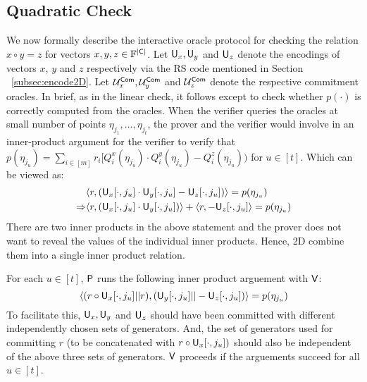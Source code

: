 \subsection{Quadratic Check}\label{subsec:quadcheck2D}
We now formally describe the interactive oracle protocol for checking the relation $x\circ y = z$ for vectors $x,y,z\in \mathbb{F}^{\mathsf{|C|}}$. Let $\mathsf{U}_x, \mathsf{U}_y$ and $\mathsf{U}_z$ denote the encodings of vectors $x$, $y$ and $z$ respectively via the RS code mentioned in Section ~\ref{subsec:encode2D}. Let $\mathcal{U}^{\mathsf{Com}}_x,\mathcal{U}^{\mathsf{Com}}_y$ and $\mathcal{U}^{\mathsf{Com}}_z$ denote the respective commitment oracles. In brief, as in the linear check, it follows \cite{ligero} except to check whether $p(\cdot)$ is correctly computed from the oracles. When the verifier queries the oracles at small number of points $\eta_{j_1} , \ldots , \eta_{j_t}$, the prover and the verifier would involve in an inner-product argument for the verifier to verify that $p(\eta_{j_u})=\sum_{i\in [m]}r_i[Q^x_i(\eta_{j_u}) \cdot Q^y_i(\eta_{j_u})-Q^z_i(\eta_{j_u}))$ for $u\in [t]$.
Which can be viewed as:
\begin{align*}
&\langle r,(\mathsf{U}_x[\cdot,j_u]\cdot \mathsf{U}_y[\cdot,j_u] - \mathsf{U}_z[\cdot,j_u])\rangle = p(\eta_{j_u}) \\
\Rightarrow &\langle r,(\mathsf{U}_x[\cdot,j_u]\cdot \mathsf{U}_y[\cdot,j_u])\rangle + \langle r,-\mathsf{U}_z[\cdot,j_u]\rangle = p(\eta_{j_u})
\end{align*}
	There are two inner products in the above statement and the prover does not want to reveal the values of the individual inner products. Hence, \name2D combine them into a single inner product relation.

For each $u\in[t]$, $\mathsf{P}$ runs the following inner product arguement with $\mathsf{V}$:
$$\langle (r\circ \mathsf{U}_x[\cdot,j_u]||r),(\mathsf{U}_y[\cdot,j_u]||-\mathsf{U}_z[\cdot,j_u])\rangle = p(\eta_{j_u})$$
To facilitate this, $\mathsf{U}_x, \mathsf{U}_y$ and $\mathsf{U}_z$ should have been committed with different independently chosen sets of generators. And, the set of generators used for committing $r$ (to be concatenated with $r \circ \mathsf{U}_x [\cdot, j_u])$ should also be independent of the above three sets of generators. $\mathsf{V}$ proceeds if the arguements succeed for all $u\in[t]$.

